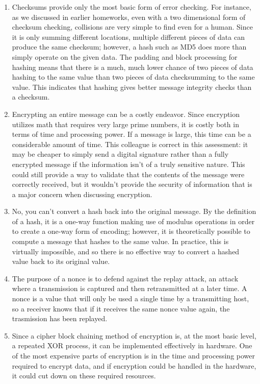 


\begin{enumerate}
    \item Checksums provide only the most basic form of error checking. For instance, as we discussed in earlier homeworks, even with a two dimensional form of checksum checking, collisions are very simple to find even for a human. Since it is only summing different locations, multiple different pieces of data can produce the same checksum; however, a hash such as MD5 does more than simply operate on the given data. The padding and block processing for hashing means that there is a much, much lower chance of two pieces of data hashing to the same value than two pieces of data checksumming to the same value. This indicates that hashing gives better message integrity checks than a checksum.

    \item Encrypting an entire message can be a costly endeavor. Since encryption utilizes math that requires very large prime numbers, it is costly both in terms of time and processing power. If a message is large, this time can be a considerable amount of time. This colleague is correct  in this assessment: it may be cheaper to simply send a digital signature rather than a fully encrypted message if the information isn't of a truly sensitive nature. This could still provide a way to validate that the contents of the message were correctly received, but it wouldn't provide the security of information that is a major concern when discussing encryption.

    \item No, you can't convert a hash back into the original message. By the definition of a hash, it is a one-way function making use of modulus operations in order to create a one-way form of encoding; however, it is theoretically possible to compute a message that hashes to the same value. In practice, this is virtually impossible, and so there is no effective way to convert a hashed value back to its original value.

    \item The purpose of a nonce is to defend against the replay attack, an attack where a transmission is captured and then retransmitted at a later time. A nonce is a value that will only be used a single time by a transmitting host, so a receiver knows that if it receives the same nonce value again, the trasmission has been replayed.

    \item Since a cipher block chaining method of encryption is, at the most basic level, a repeated XOR process, it can be implemented effectively in hardware. One of the most expensive parts of encryption is in the time and processing power required to encrypt data, and if encryption could be handled in the hardware, it could cut down on these required resources.


\end{enumerate}
